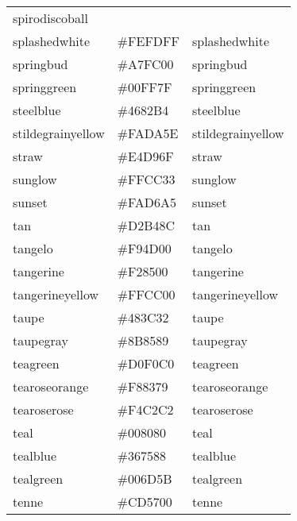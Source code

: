 \documentclass[
]{article}
\begin{document}
\begin{longtable}[]{@{}lll@{}}
\textcolor[rgb]{0.06,0.75,0.99}{spirodiscoball        }\tabularnewline
splashedwhite & \colorbox[rgb]{1.0,0.99,1.0}{\#FEFDFF} &
\textcolor[rgb]{1.0,0.99,1.0}{splashedwhite         }\tabularnewline
springbud & \colorbox[rgb]{0.65,0.99,0.0}{\#A7FC00} &
\textcolor[rgb]{0.65,0.99,0.0}{springbud             }\tabularnewline
springgreen & \colorbox[rgb]{0.0,1.0,0.5}{\#00FF7F} &
\textcolor[rgb]{0.0,1.0,0.5}{springgreen           }\tabularnewline
steelblue & \colorbox[rgb]{0.27,0.51,0.71}{\#4682B4} &
\textcolor[rgb]{0.27,0.51,0.71}{steelblue             }\tabularnewline
stildegrainyellow & \colorbox[rgb]{0.98,0.85,0.37}{\#FADA5E} &
\textcolor[rgb]{0.98,0.85,0.37}{stildegrainyellow     }\tabularnewline
straw & \colorbox[rgb]{0.89,0.85,0.44}{\#E4D96F} &
\textcolor[rgb]{0.89,0.85,0.44}{straw                 }\tabularnewline
sunglow & \colorbox[rgb]{1.0,0.8,0.2}{\#FFCC33} &
\textcolor[rgb]{1.0,0.8,0.2}{sunglow               }\tabularnewline
sunset & \colorbox[rgb]{0.98,0.84,0.65}{\#FAD6A5} &
\textcolor[rgb]{0.98,0.84,0.65}{sunset                }\tabularnewline
tan & \colorbox[rgb]{0.82,0.71,0.55}{\#D2B48C} &
\textcolor[rgb]{0.82,0.71,0.55}{tan                   }\tabularnewline
tangelo & \colorbox[rgb]{0.98,0.3,0.0}{\#F94D00} &
\textcolor[rgb]{0.98,0.3,0.0}{tangelo               }\tabularnewline
tangerine & \colorbox[rgb]{0.95,0.52,0.0}{\#F28500} &
\textcolor[rgb]{0.95,0.52,0.0}{tangerine             }\tabularnewline
tangerineyellow & \colorbox[rgb]{1.0,0.8,0.0}{\#FFCC00} &
\textcolor[rgb]{1.0,0.8,0.0}{tangerineyellow       }\tabularnewline
taupe & \colorbox[rgb]{0.28,0.24,0.2}{\#483C32} &
\textcolor[rgb]{0.28,0.24,0.2}{taupe                 }\tabularnewline
taupegray & \colorbox[rgb]{0.55,0.52,0.54}{\#8B8589} &
\textcolor[rgb]{0.55,0.52,0.54}{taupegray             }\tabularnewline
teagreen & \colorbox[rgb]{0.82,0.94,0.75}{\#D0F0C0} &
\textcolor[rgb]{0.82,0.94,0.75}{teagreen              }\tabularnewline
tearoseorange & \colorbox[rgb]{0.97,0.51,0.47}{\#F88379} &
\textcolor[rgb]{0.97,0.51,0.47}{tearoseorange         }\tabularnewline
tearoserose & \colorbox[rgb]{0.96,0.76,0.76}{\#F4C2C2} &
\textcolor[rgb]{0.96,0.76,0.76}{tearoserose           }\tabularnewline
teal & \colorbox[rgb]{0.0,0.5,0.5}{\#008080} &
\textcolor[rgb]{0.0,0.5,0.5}{teal                  }\tabularnewline
tealblue & \colorbox[rgb]{0.21,0.46,0.53}{\#367588} &
\textcolor[rgb]{0.21,0.46,0.53}{tealblue              }\tabularnewline
tealgreen & \colorbox[rgb]{0.0,0.51,0.5}{\#006D5B} &
\textcolor[rgb]{0.0,0.51,0.5}{tealgreen             }\tabularnewline
tenne & \colorbox[rgb]{0.8,0.34,0.0}{\#CD5700} &
\textcolor[rgb]{0.8,0.34,0.0}{tenne                 }\tabularnewline

\end{longtable}
\end{document}
